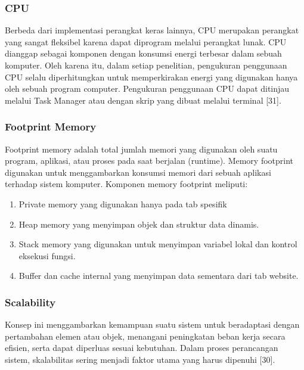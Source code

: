\subsubsection{CPU}
Berbeda dari implementasi perangkat keras lainnya, CPU merupakan perangkat yang sangat fleksibel karena dapat diprogram melalui perangkat lunak. CPU dianggap sebagai komponen dengan konsumsi energi terbesar dalam sebuah komputer. Oleh karena itu, dalam setiap penelitian, pengukuran penggunaan CPU selalu diperhitungkan untuk memperkirakan energi yang digunakan hanya oleh sebuah program computer. Pengukuran penggunaan CPU dapat ditinjau melalui Task Manager atau dengan skrip yang dibuat melalui terminal [31].

\subsubsection{Footprint Memory}
Footprint memory adalah total jumlah memori yang digunakan oleh suatu program, aplikasi, atau proses pada saat berjalan (runtime). Memory footprint digunakan untuk menggambarkan konsumsi memori dari sebuah aplikasi terhadap sistem komputer. Komponen memory footprint meliputi:
\begin{enumerate}
	\item Private memory yang digunakan hanya pada tab spesifik 
	\item Heap memory yang menyimpan objek dan struktur data dinamis.
	\item Stack memory yang digunakan untuk menyimpan variabel lokal dan kontrol eksekusi fungsi.
	\item Buffer dan cache internal yang menyimpan data sementara dari tab website.
\end{enumerate}

\subsubsection{Scalability}
Konsep ini menggambarkan kemampuan suatu sistem untuk beradaptasi dengan pertambahan elemen atau objek, menangani peningkatan beban kerja secara efisien, serta dapat diperluas sesuai kebutuhan. Dalam proses perancangan sistem, skalabilitas sering menjadi faktor utama yang harus dipenuhi [30].

